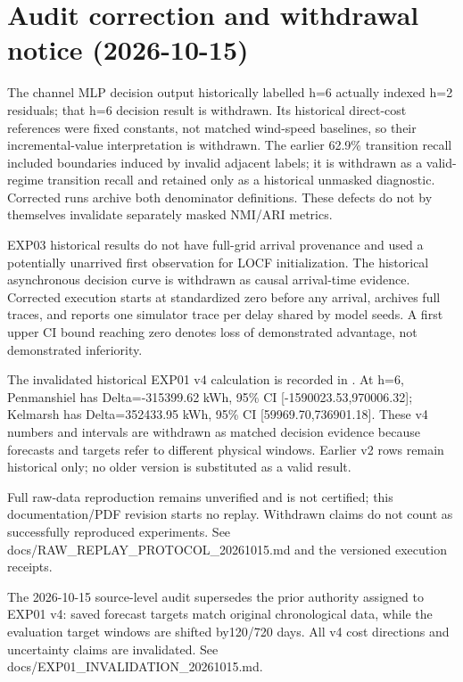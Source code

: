 \documentclass[
  journal]{IEEEtran}
\begin{document}
\section{Audit correction and withdrawal notice
(2026-10-15)}\label{audit-correction-and-withdrawal-notice-2026-10-15}

The channel MLP decision output historically labelled h=6 actually
indexed h=2 residuals; that h=6 decision result is withdrawn. Its
historical direct-cost references were fixed constants, not matched
wind-speed baselines, so their incremental-value interpretation is
withdrawn. The earlier 62.9\% transition recall included boundaries
induced by invalid adjacent labels; it is withdrawn as a valid-regime
transition recall and retained only as a historical unmasked diagnostic.
Corrected runs archive both denominator definitions. These defects do
not by themselves invalidate separately masked NMI/ARI metrics.

EXP03 historical results do not have full-grid arrival provenance and
used a potentially unarrived first observation for LOCF initialization.
The historical asynchronous decision curve is withdrawn as causal
arrival-time evidence. Corrected execution starts at standardized zero
before any arrival, archives full traces, and reports one simulator
trace per delay shared by model seeds. A first upper CI bound reaching
zero denotes loss of demonstrated advantage, not demonstrated
inferiority.

The invalidated historical EXP01 v4 calculation is recorded in
.
At h=6, Penmanshiel has Delta=-315399.62 kWh, 95\% CI
{[}-1590023.53,970006.32{]}; Kelmarsh has Delta=352433.95 kWh, 95\% CI
{[}59969.70,736901.18{]}. These v4 numbers and intervals are withdrawn
as matched decision evidence because forecasts and targets refer to
different physical windows. Earlier v2 rows remain historical only; no
older version is substituted as a valid result.

Full raw-data reproduction remains unverified and is not certified; this
documentation/PDF revision starts no replay. Withdrawn claims do not
count as successfully reproduced experiments. See
docs/RAW\_REPLAY\_PROTOCOL\_20261015.md and the versioned execution
receipts.

The 2026-10-15 source-level audit supersedes the prior authority
assigned to EXP01 v4: saved forecast targets match original
chronological data, while the evaluation target windows are shifted
by120/720 days. All v4 cost directions and uncertainty claims are
invalidated. See docs/EXP01\_INVALIDATION\_20261015.md.
\end{document}
